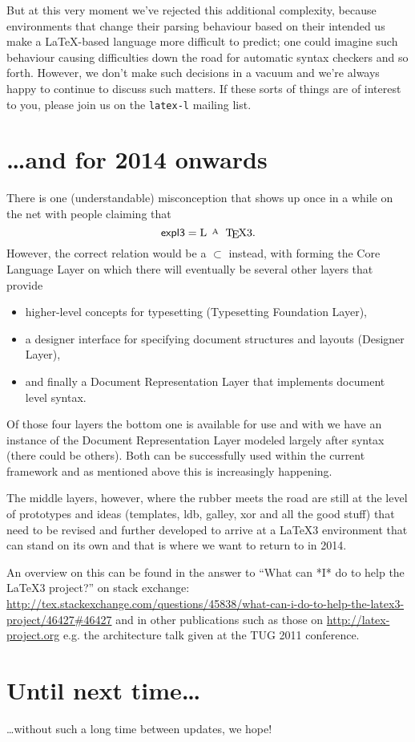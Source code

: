 \documentclass{ltnews}
\begin{document}
But at this very moment we've rejected this additional complexity, because environments that change their parsing behaviour based on their intended us make a \LaTeX-based language more difficult to predict; one could imagine such behaviour causing difficulties down the road for automatic syntax checkers and so forth.
However, we don't make such decisions in a vacuum and we're always happy to continue to discuss such matters.
If these sorts of things are of interest to you, please join us on the \texttt{latex-l} mailing list.


\section{\ldots and for 2014 onwards}

There is one (understandable) misconception that shows up once in a while on the net with people claiming that
\[
         \textrm{\pkg{expl3}} = \textrm{\LaTeX3}.
\]
However, the correct relation would be a $\subset$ instead, with  forming the Core Language Layer on which  there will eventually be several other layers that \mbox{provide} 
\begin{itemize}
\item higher-level concepts for typesetting (Typesetting Foundation Layer), 
\item a designer interface for specifying document structures and layouts (Designer Layer), 
\item and finally a Document Representation Layer that implements document level syntax.
\end{itemize}
Of those four layers the bottom one  is available for use and with  we have an instance of the Document Representation Layer modeled largely after \LaTeXe{} syntax (there could be others). Both can be successfully used within the current \LaTeXe{} framework and as mentioned above this is increasingly happening.

The middle layers, however, where the rubber meets the road are still  at the level of prototypes and ideas (templates, ldb, galley, xor and all the good stuff) that need to be revised and further developed to arrive at a \LaTeX3 environment that can stand on its own and that is where we want to return to in 2014.

An overview on this can be found in the answer to ``What can *I* do to help the \LaTeX3 project?'' on stack exchange:\newline
\url{http://tex.stackexchange.com/questions/45838/what-can-i-do-to-help-the-latex3-project/46427#46427}\newline\noindent
and in other publications such as those on\newline
 \url{http://latex-project.org}\newline\noindent
 e.g. the architecture talk given at the TUG 2011 conference.


\section{Until next time\dots}

\dots without such a long time between updates, we hope!
\end{document}
